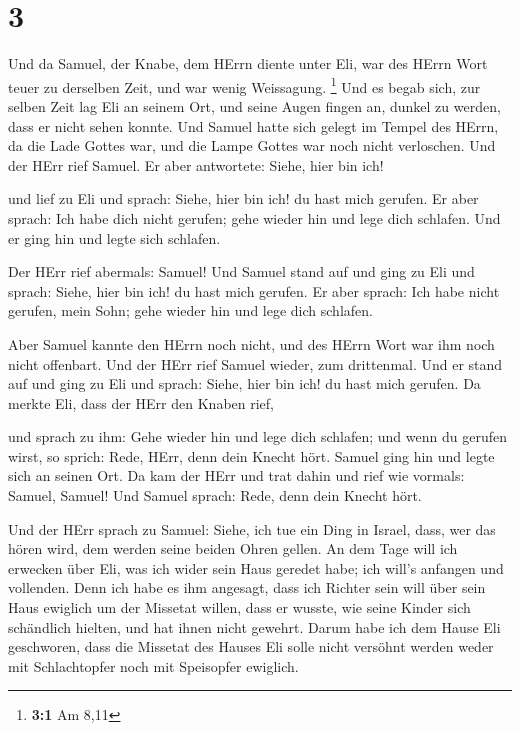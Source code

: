 \hypertarget{section-2}{%
\section{3}\label{section-2}}

 Und da Samuel, der Knabe, dem HErrn diente unter Eli, war
des HErrn Wort teuer zu derselben Zeit, und war wenig Weissagung.
\footnote{\textbf{3:1} Am 8,11}  Und es begab sich, zur
selben Zeit lag Eli an seinem Ort, und seine Augen fingen an, dunkel zu
werden, dass er nicht sehen konnte.  Und Samuel hatte sich
gelegt im Tempel des HErrn, da die Lade Gottes war, und die Lampe Gottes
war noch nicht verloschen.  Und der HErr rief Samuel. Er
aber antwortete: Siehe, hier bin ich!

 und lief zu Eli und sprach: Siehe, hier bin ich! du hast
mich gerufen. Er aber sprach: Ich habe dich nicht gerufen; gehe wieder
hin und lege dich schlafen. Und er ging hin und legte sich schlafen.

 Der HErr rief abermals: Samuel! Und Samuel stand auf und
ging zu Eli und sprach: Siehe, hier bin ich! du hast mich gerufen. Er
aber sprach: Ich habe nicht gerufen, mein Sohn; gehe wieder hin und lege
dich schlafen.

 Aber Samuel kannte den HErrn noch nicht, und des HErrn
Wort war ihm noch nicht offenbart.  Und der HErr rief
Samuel wieder, zum drittenmal. Und er stand auf und ging zu Eli und
sprach: Siehe, hier bin ich! du hast mich gerufen. Da merkte Eli, dass
der HErr den Knaben rief,

 und sprach zu ihm: Gehe wieder hin und lege dich
schlafen; und wenn du gerufen wirst, so sprich: Rede, HErr, denn dein
Knecht hört. Samuel ging hin und legte sich an seinen Ort.
 Da kam der HErr und trat dahin und rief wie vormals:
Samuel, Samuel! Und Samuel sprach: Rede, denn dein Knecht hört.

 Und der HErr sprach zu Samuel: Siehe, ich tue ein Ding
in Israel, dass, wer das hören wird, dem werden seine beiden Ohren
gellen.  An dem Tage will ich erwecken über Eli, was ich
wider sein Haus geredet habe; ich will's anfangen und vollenden.
 Denn ich habe es ihm angesagt, dass ich Richter sein
will über sein Haus ewiglich um der Missetat willen, dass er wusste, wie
seine Kinder sich schändlich hielten, und hat ihnen nicht gewehrt.
 Darum habe ich dem Hause Eli geschworen, dass die
Missetat des Hauses Eli solle nicht versöhnt werden weder mit
Schlachtopfer noch mit Speisopfer ewiglich.

